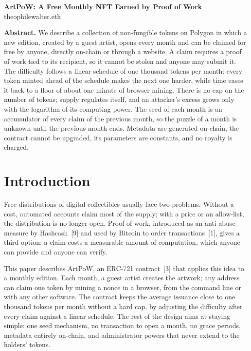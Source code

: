 \documentclass[10pt,letterpaper]{article}
\begin{document}
\begin{center}
  {\Large\bfseries ArtPoW: A Free Monthly NFT Earned by Proof of Work}\\[10pt]
  theophilewalter.eth\\
\end{center}

\vspace{4pt}
\begin{list}{}{\leftmargin=0.45in\rightmargin=0.45in}\item\relax
\textbf{Abstract.} We describe a collection of non-fungible tokens on Polygon in which a new edition, created by a
guest artist, opens every month and can be claimed for free by anyone, directly on-chain or through a website. A
claim requires a proof of work tied to its recipient, so it cannot be stolen and anyone may submit it. The
difficulty follows a linear schedule of one thousand tokens per month: every token minted ahead of the schedule
makes the next one harder, while time eases it back to a floor of about one minute of browser mining. There is no
cap on the number of tokens; supply regulates itself, and an attacker's excess grows only with the logarithm of
its computing power. The seed of each month is an accumulator of every claim of the previous month, so the
puzzle of a month is unknown until the previous month ends. Metadata are generated on-chain, the contract cannot
be upgraded, its parameters are constants, and no royalty is charged.
\end{list}

\section{Introduction}

Free distributions of digital collectibles usually face two problems. Without a cost, automated accounts claim
most of the supply; with a price or an allow-list, the distribution is no longer open. Proof of work, introduced
as an anti-abuse measure by Hashcash~[9] and used by Bitcoin to order transactions~[1], gives a third option: a
claim costs a measurable amount of computation, which anyone can provide and anyone can verify.

This paper describes ArtPoW, an ERC-721 contract~[3] that applies this idea to a monthly edition. Each month, a guest artist creates
the artwork; any address can claim one token by mining a nonce in a browser, from the command line or with any
other software. The contract keeps the average issuance close to one thousand tokens per month without a hard
cap, by adjusting the difficulty after every claim against a linear schedule. The rest of the design aims at
staying simple: one seed mechanism, no transaction to open a month, no grace periods, metadata entirely on-chain,
and administrator powers that never extend to the holders' tokens.
\end{document}
